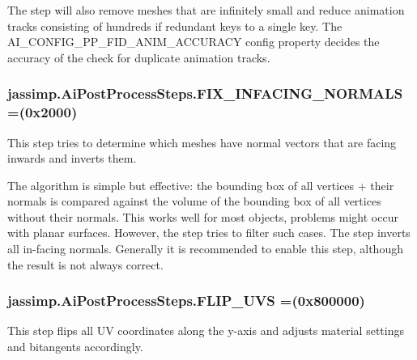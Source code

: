 The step will also remove meshes that are infinitely small and reduce animation tracks consisting of hundreds if redundant keys to a single key. The {\ttfamily A\+I\+\_\+\+C\+O\+N\+F\+I\+G\+\_\+\+P\+P\+\_\+\+F\+I\+D\+\_\+\+A\+N\+I\+M\+\_\+\+A\+C\+C\+U\+R\+A\+C\+Y} config property decides the accuracy of the check for duplicate animation tracks. \hypertarget{enumjassimp_1_1_ai_post_process_steps_a21e006d635a60564ed5740bce344f1bc}{
\subsubsection[{F\+I\+X\+\_\+\+I\+N\+F\+A\+C\+I\+N\+G\+\_\+\+N\+O\+R\+M\+A\+L\+S}]{\setlength{\rightskip}{0pt plus 5cm}jassimp.\+Ai\+Post\+Process\+Steps.\+F\+I\+X\+\_\+\+I\+N\+F\+A\+C\+I\+N\+G\+\_\+\+N\+O\+R\+M\+A\+L\+S =(0x2000)}}\label{enumjassimp_1_1_ai_post_process_steps_a21e006d635a60564ed5740bce344f1bc}
This step tries to determine which meshes have normal vectors that are facing inwards and inverts them.

The algorithm is simple but effective\+: the bounding box of all vertices + their normals is compared against the volume of the bounding box of all vertices without their normals. This works well for most objects, problems might occur with planar surfaces. However, the step tries to filter such cases. The step inverts all in-\/facing normals. Generally it is recommended to enable this step, although the result is not always correct. \hypertarget{enumjassimp_1_1_ai_post_process_steps_a53870b589cdfb8305323efcc19915c2b}{
\subsubsection[{F\+L\+I\+P\+\_\+\+U\+V\+S}]{\setlength{\rightskip}{0pt plus 5cm}jassimp.\+Ai\+Post\+Process\+Steps.\+F\+L\+I\+P\+\_\+\+U\+V\+S =(0x800000)}}\label{enumjassimp_1_1_ai_post_process_steps_a53870b589cdfb8305323efcc19915c2b}
This step flips all U\+V coordinates along the y-\/axis and adjusts material settings and bitangents accordingly.

